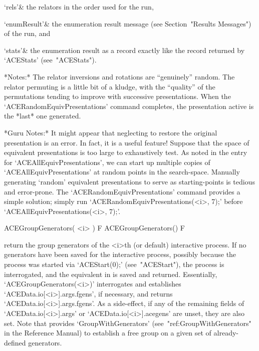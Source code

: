 \beginitems

\quad`rels'& the relators in the order used for the run,

\quad`enumResult'&  the  {\ACE}  enumeration   result   message   (see
Section~"Results Messages") of the run, and

\quad`stats'& the enumeration result as a {\GAP} record  exactly  like
the record returned by `ACEStats' (see~"ACEStats").

\enditems

*Notes:*
The relator inversions and rotations  are  ``genuinely''  random.  The
relator permuting is a little bit of a kludge, with the ``quality'' of
the permutations tending to  improve  with  successive  presentations.
When  the   `ACERandomEquivPresentations'   command   completes,   the
presentation active is the *last* one generated.

*Guru Notes:*
It might appear that neglecting to restore the  original  presentation
is an error. In fact, it is a useful feature! Suppose that  the  space
of equivalent presentations is too  large  to  exhaustively  test.  As
noted in the entry for `ACEAllEquivPresentations',  we  can  start  up
multiple copies of `ACEAllEquivPresentations' at random points in  the
search-space. Manually generating `random' equivalent presentations to
serve   as   starting-points   is   tedious   and   error-prone.   The
`ACERandomEquivPresentations'  command  provides  a  simple  solution;
simply    run    `ACERandomEquivPresentations(<i>,     7);'     before
`ACEAllEquivPresentations(<i>, 7);'.


\>ACEGroupGenerators( <i> ) F
\>ACEGroupGenerators() F

return  the  {\GAP}  group  generators  of  the  <i>th  (or   default)
interactive {\ACE} process. If no generators have been saved  for  the
interactive {\ACE} process, possibly because the process  was  started
via   `ACEStart(0);'   (see~"ACEStart"),   the   {\ACE}   process   is
interrogated, and the equivalent in  {\GAP}  is  saved  and  returned.
Essentially,   `ACEGroupGenerators(<i>)'   interrogates   {\ACE}   and
establishes `ACEData.io[<i>].args.fgens', if  necessary,  and  returns
`ACEData.io[<i>].args.fgens'.  As  a  side-effect,  if  any   of   the
remaining       fields       of       `ACEData.io[<i>].args'        or
`ACEData.io[<i>].acegens' are unset, they  are  also  set.  Note  that
{\GAP} provides  `GroupWithGenerators'  (see~"ref:GroupWithGenerators"
in the {\GAP} Reference Manual) to establish a free group on  a  given
set of already-defined generators.

